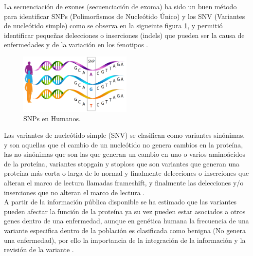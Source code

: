 La secuenciación de exones (secuenciación de exoma) ha sido un buen método para identificar SNPs (Polimorfismos de Nucleótido Único) y los SNV (Variantes de nucleótido simple) como se observa en la sigueinte figura \ref{fig:snp}, y permitió identificar pequeñas delecciones o inserciones (indels) que pueden  ser la causa de enfermedades y de la variación en los fenotipos \cite{Deng2011,Wenger2017}.

\begin{figure}[h!] 
	\centering
	\includegraphics[width=0.5\textwidth]{Estado/snp}
	\caption{SNPs en Humanos.} \label{fig:snp}
\end{figure}

Las variantes de nucleótido simple (SNV) se clasifican como variantes sinónimas, y son aquellas que el cambio de un nucleótido no genera cambios en la proteína, las no sinónimas que son las que generan un cambio en uno o varios aminoácidos de la proteína, variantes stopgain y stoploss que son variantes que generan una proteína más corta o larga de lo normal y finalmente delecciones o inserciones que alteran el marco de lectura llamadas frameshift, y finalmente las delecciones y/o inserciones que no alteran el marco de lectura \cite{Liu2016}.\\   

A partir de la información pública disponible se ha estimado que las variantes pueden afectar la función de la proteína ya su vez pueden estar asociados a otros genes dentro de una enfermedad, aunque en genética humana la frecuencia de una variante especifica dentro de la población es clasificada como benigna (No genera una enfermedad), por ello la importancia de la integración de la información y la revisión de la variante \cite{Shendure2016}.\\

